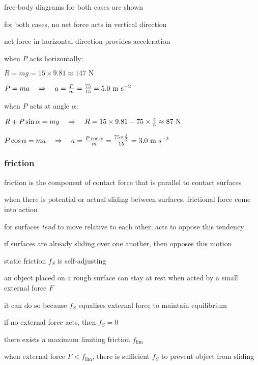 \sol free-body diagrams for both cases are shown

for both cases, no net force acts in vertical direction

net force in horizontal direction provides acceleration

when $P$ acts horizontally:

{
	\centering
	
	$ R = mg = 15\times 9.81 \approx 147 \text{ N}$
	
	$ P = ma \quad \Rightarrow \quad a = \frac{P}{m} = \frac{75}{15} = 5.0 \text{ m s$^{-2}$} $
		
}

when $P$ acts at angle $\alpha$:

{
	\centering
	
	$R + P\sin\alpha = mg \quad \Rightarrow \quad R = 15\times9.81-75\times\frac{4}{5} \approx 87 \text{ N}$
	
	\eqyskip $ P\cos\alpha = ma \quad \Rightarrow \quad a = \frac{P\cos\alpha}{m} = \frac{75\times\frac{3}{5}}{15} = 3.0 \text{ m s$^{-2}$} $
	
	\feoe
	
}



\subsubsection{friction}

friction is the component of contact force that is parallel to contact surfaces

when there is potential or actual sliding between surfaces, frictional force come into action

\titem for surfaces \emph{tend} to move relative to each other,  acts to oppose this tendency

\titem if surfaces are already sliding over one another, then  opposes this motion

\cmt static friction $f_S$ is self-adjusting

an object placed on a rough surface can stay at rest when acted by a small external force $F$

it can do so because $f_S$ equalises external force to maintain equilibrium

if no external force acts, then $f_S=0$

\cmt there exists a maximum limiting friction $f_\text{lim}$

when external force $F < f_\text{lim}$, there is sufficient $f_S$ to prevent object from sliding


